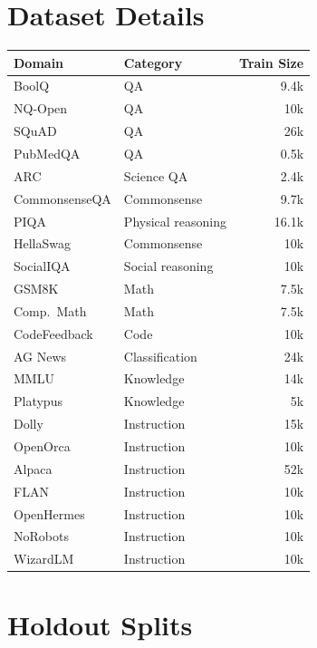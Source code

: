\section{Dataset Details}
\label{app:domains}

\begin{center}
\begin{minipage}{\linewidth}
\centering
{}
\label{tab:domains}
\small
\setlength{\tabcolsep}{6pt}
\renewcommand{\arraystretch}{1.0}
\begin{tabular}{@{}llr@{}}
\toprule
\textbf{Domain} & \textbf{Category} & \textbf{Train Size} \\
\midrule
BoolQ & QA & 9.4k \\
NQ-Open & QA & 10k \\
SQuAD & QA & 26k \\
PubMedQA & QA & 0.5k \\
ARC & Science QA & 2.4k \\
CommonsenseQA & Commonsense & 9.7k \\
PIQA & Physical reasoning & 16.1k \\
HellaSwag & Commonsense & 10k \\
SocialIQA & Social reasoning & 10k \\
GSM8K & Math & 7.5k \\
Comp.\ Math & Math & 7.5k \\
CodeFeedback & Code & 10k \\
AG News & Classification & 24k \\
MMLU & Knowledge & 14k \\
Platypus & Knowledge & 5k \\
Dolly & Instruction & 15k \\
OpenOrca & Instruction & 10k \\
Alpaca & Instruction & 52k \\
FLAN & Instruction & 10k \\
OpenHermes & Instruction & 10k \\
NoRobots & Instruction & 10k \\
WizardLM & Instruction & 10k \\
\bottomrule
\end{tabular}
\end{minipage}
\end{center}

\section{Holdout Splits}
\label{app:splits}

